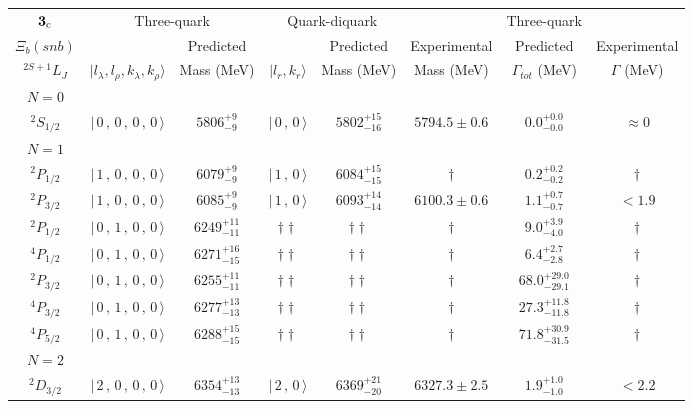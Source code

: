 \begin{tabular}{c| c c c c c c c}\hline \hline
${\bf {3}}_{\rm c}$ & \multicolumn{2}{c}{Three-quark} &  \multicolumn{2}{c}{Quark-diquark}   &    &  Three-quark  &\\ 
$\Xi_{b}(snb)$ &   & Predicted  &   &  Predicted   &  Experimental &  Predicted            & Experimental \\ 
 $^{2S+1}L_{J}$ & $\vert l_{\lambda}, l_{\rho}, k_{\lambda}, k_{\rho} \rangle$ & Mass (MeV)  & $\vert l_{r}, k_{r} \rangle$  &  Mass (MeV)   &  Mass (MeV)   &  $\Gamma_{tot}$ (MeV) & $\Gamma$ (MeV) \\ \hline
\hline
 $N=0$  &  &  &  &  &  \\ 
$^{2}S_{1/2}$ & $\vert \,0\,,\,0\,,\,0\,,\,0 \,\rangle $ & $5806^{+9}_{-9}$ & $\vert \,0\,,\,0 \,\rangle$ & $5802^{+15}_{-16}$ & $5794.5\pm 0.6$ & $0.0^{+0.0}_{-0.0}$ & $\approx 0$ \\ 
\hline
 $N=1$  &  &  &  &  &  \\ 
$^{2}P_{1/2}$ & $\vert \,1\,,\,0\,,\,0\,,\,0 \,\rangle $ & $6079^{+9}_{-9}$ & $\vert \,1\,,\,0 \,\rangle$ & $6084^{+15}_{-15}$ & $\dagger$ & $0.2^{+0.2}_{-0.2}$ & $\dagger$ \\ 
$^{2}P_{3/2}$ & $\vert \,1\,,\,0\,,\,0\,,\,0 \,\rangle $ & $6085^{+9}_{-9}$ & $\vert \,1\,,\,0 \,\rangle$ & $6093^{+14}_{-14}$ & $6100.3\pm 0.6$ & $1.1^{+0.7}_{-0.7}$ & $<1.9$ \\ 
$^{2}P_{1/2}$ & $\vert \,0\,,\,1\,,\,0\,,\,0 \,\rangle $ & $6249^{+11}_{-11}$ & $\dagger\dagger$ & $\dagger\dagger$ & $\dagger$ & $9.0^{+3.9}_{-4.0}$ & $\dagger$ \\ 
$^{4}P_{1/2}$ & $\vert \,0\,,\,1\,,\,0\,,\,0 \,\rangle $ & $6271^{+16}_{-15}$ & $\dagger\dagger$ & $\dagger\dagger$ & $\dagger$ & $6.4^{+2.7}_{-2.8}$ & $\dagger$ \\ 
$^{2}P_{3/2}$ & $\vert \,0\,,\,1\,,\,0\,,\,0 \,\rangle $ & $6255^{+11}_{-11}$ & $\dagger\dagger$ & $\dagger\dagger$ & $\dagger$ & $68.0^{+29.0}_{-29.1}$ & $\dagger$ \\ 
$^{4}P_{3/2}$ & $\vert \,0\,,\,1\,,\,0\,,\,0 \,\rangle $ & $6277^{+13}_{-13}$ & $\dagger\dagger$ & $\dagger\dagger$ & $\dagger$ & $27.3^{+11.8}_{-11.8}$ & $\dagger$ \\ 
$^{4}P_{5/2}$ & $\vert \,0\,,\,1\,,\,0\,,\,0 \,\rangle $ & $6288^{+15}_{-15}$ & $\dagger\dagger$ & $\dagger\dagger$ & $\dagger$ & $71.8^{+30.9}_{-31.5}$ & $\dagger$ \\ 
\hline
 $N=2$  &  &  &  &  &  \\ 
$^{2}D_{3/2}$ & $\vert \,2\,,\,0\,,\,0\,,\,0 \,\rangle $ & $6354^{+13}_{-13}$ & $\vert \,2\,,\,0 \,\rangle$ & $6369^{+21}_{-20}$ & $6327.3\pm 2.5$ & $1.9^{+1.0}_{-1.0}$ & $<2.2$ \\ 

\end{tabular}
